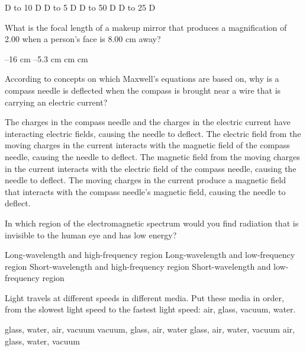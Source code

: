 \documentclass[12pt,addpoints]{exam}
\begin{document}
{{{\begin{questions}
					\begin{oneparchoices}
						 D to 10 D
						 D to 5 D
						 D to 50 D
						 D to 25 D
					\end{oneparchoices}
					\question What is the focal length of a makeup mirror that produces a magnification of 2.00 when a person’s face is 8.00 cm away? \\
					\begin{oneparchoices}
						\choice –16 cm
						\choice –5.3 cm
						\choice 5.3 cm
						\choice 16 cm
					\end{oneparchoices}
					\question According to concepts on which Maxwell’s equations are based on, why is a compass needle is deflected when the compass is brought near a wire that is carrying an electric current?
					\begin{choices}
						\choice The charges in the compass needle and the charges in the electric current have interacting electric fields, causing the needle to deflect.
						\choice The electric field from the moving charges in the current interacts with the magnetic field of the compass needle, causing the needle to deflect.
						\choice The magnetic field from the moving charges in the current interacts with the electric field of the compass needle, causing the needle to deflect.
						\choice The moving charges in the current produce a magnetic field that interacts with the compass needle’s magnetic field, causing the needle to deflect.
					\end{choices}
					\question In which region of the electromagnetic spectrum would you find radiation that is invisible to the human eye and has low energy? \\
					\begin{oneparchoices}
					\choice Long-wavelength and high-frequency region
					\choice Long-wavelength and low-frequency region
					\choice Short-wavelength and high-frequency region
					\choice Short-wavelength and low-frequency region
					\end{oneparchoices}
					\question Light travels at different speeds in different media. Put these media in order, from the slowest light speed to the fastest light speed: air, glass, vacuum, water. \\
					\begin{oneparchoices}
						\choice glass, water, air, vacuum
						\choice vacuum, glass, air, water
						\choice glass, air, water, vacuum
						\choice air, glass, water, vacuum	
					\end{oneparchoices}

\end{questions}}}}
\end{document}
